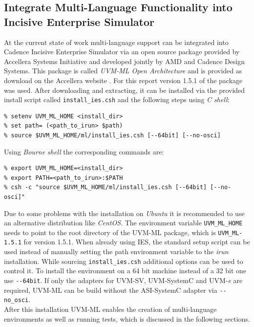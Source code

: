 \subsection{Integrate Multi-Language Functionality into Incisive Enterprise
Simulator}
At the current state of work multi-language support can be integrated into Cadence Incisive Enterprise Simulator via an open source package provided by Accellera Systems Initiative and developed jointly by AMD and Cadence Design
Systems. This package is called \emph{UVM-ML Open Architecture} and is provided as download on the Accellera website \cite{uvm_ml}.
For this report version 1.5.1 of the package was used. After downloading and extracting, it can be
installed via the provided install script called \lstinline$install_ies.csh$ and the following steps using \emph{C shell}:

\medskip
{}
\begin{lstlisting}
% setenv UVM_ML_HOME <install_dir>
% set path= (<path_to_irun> $path)
% source $UVM_ML_HOME/ml/install_ies.csh [--64bit] [--no-osci]
\end{lstlisting} 
\medskip 

Using \emph{Bourne shell} the corresponding commands are:

\medskip
{}
\begin{lstlisting}
% export UVM_ML_HOME=<install_dir>
% export PATH=<path_to_irun>:$PATH
% csh -c "source $UVM_ML_HOME/ml/install_ies.csh [--64bit] [--no-osci]"
\end{lstlisting} 
\medskip 

Due to some problems with the installation on \emph{Ubuntu} it is recommended to use an alternative distribution like
\emph{CentOS}. The environment variable \lstinline$UVM_ML_HOME$ needs to point to the root directory of the UVM-ML
package, which is \lstinline$UVM_ML-1.5.1$ for version 1.5.1. When already using IES, the standard setup script can be used
instead of manually setting the path environment variable to the \emph{irun} installation. While sourcing
\lstinline$install_ies.csh$ additional options can be used to control it. To install the environment on a 64 bit machine
instead of a 32 bit one use \lstinline$--64bit$. If only the adapters for UVM-SV, UVM-SystemC and
UVM-\textit{e} are required, UVM-ML can be build without the ASI-SystemC adapter via \lstinline$--no_osci$.\\
After this installation UVM-ML enables the creation of multi-language environments as well as running tests, which is
discussed in the following sections.

